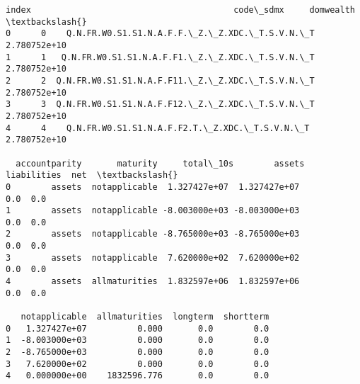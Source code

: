 \documentclass[11pt]{article}
\begin{document}
    \begin{Verbatim}[commandchars=\\\{\}]
   index                                        code\_sdmx     domwealth  \textbackslash{}
0      0    Q.N.FR.W0.S1.S1.N.A.F.F.\_Z.\_Z.XDC.\_T.S.V.N.\_T  2.780752e+10
1      1   Q.N.FR.W0.S1.S1.N.A.F.F1.\_Z.\_Z.XDC.\_T.S.V.N.\_T  2.780752e+10
2      2  Q.N.FR.W0.S1.S1.N.A.F.F11.\_Z.\_Z.XDC.\_T.S.V.N.\_T  2.780752e+10
3      3  Q.N.FR.W0.S1.S1.N.A.F.F12.\_Z.\_Z.XDC.\_T.S.V.N.\_T  2.780752e+10
4      4    Q.N.FR.W0.S1.S1.N.A.F.F2.T.\_Z.XDC.\_T.S.V.N.\_T  2.780752e+10

  accountparity       maturity     total\_10s        assets  liabilities  net  \textbackslash{}
0        assets  notapplicable  1.327427e+07  1.327427e+07          0.0  0.0
1        assets  notapplicable -8.003000e+03 -8.003000e+03          0.0  0.0
2        assets  notapplicable -8.765000e+03 -8.765000e+03          0.0  0.0
3        assets  notapplicable  7.620000e+02  7.620000e+02          0.0  0.0
4        assets  allmaturities  1.832597e+06  1.832597e+06          0.0  0.0

   notapplicable  allmaturities  longterm  shortterm
0   1.327427e+07          0.000       0.0        0.0
1  -8.003000e+03          0.000       0.0        0.0
2  -8.765000e+03          0.000       0.0        0.0
3   7.620000e+02          0.000       0.0        0.0
4   0.000000e+00    1832596.776       0.0        0.0
    \end{Verbatim}
\end{document}
